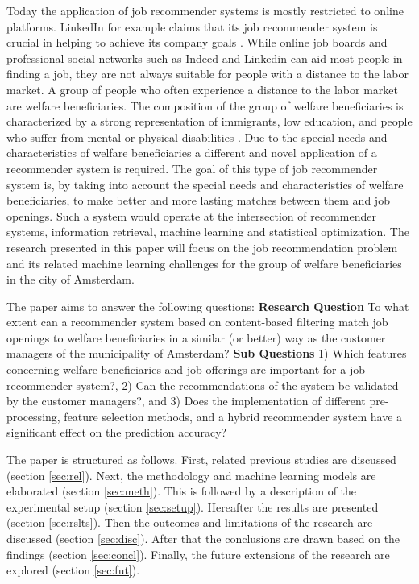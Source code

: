 Today the application of job recommender systems is mostly restricted to online platforms. 
LinkedIn for example claims that its job recommender system is crucial in helping to achieve its company goals \cite{kenthapadi2017personalized}.
While online job boards and professional social networks such as Indeed and Linkedin can aid most people in finding a job, they are not always suitable for people with a distance to the labor market.
A group of people who often experience a distance to the labor market are welfare beneficiaries. 
The composition of the group of welfare beneficiaries is characterized by a strong representation of immigrants, low education, and people who suffer from mental or physical disabilities \cite{dodeweerd}.
Due to the special needs and characteristics of welfare beneficiaries a different and novel application of a recommender system is required. 
The goal of this type of job recommender system is, by taking into account the special needs and characteristics of welfare beneficiaries, to make better and more lasting matches between them and job openings.
Such a system would operate at the intersection of recommender systems, information retrieval, machine learning and statistical optimization. 
The research presented in this paper will focus on the job recommendation problem and its related machine learning challenges for the group of welfare beneficiaries in the city of Amsterdam. 

The paper aims to answer the following questions:
\textbf{Research Question} To what extent can a recommender system based on content-based filtering match job openings to welfare beneficiaries in a similar (or better) way as the customer managers of the municipality of Amsterdam?
\textbf{Sub Questions}
1) Which features concerning welfare beneficiaries and job offerings are important for a job recommender system?, 2) Can the  recommendations of the system be validated by the customer managers?, and 3) Does the implementation of different pre-processing, feature selection methods, and a hybrid recommender system have a significant effect on the prediction accuracy?

The paper is structured as follows. First, related previous studies are discussed (section \ref{sec:rel}). Next, the methodology and machine learning models are elaborated (section \ref{sec:meth}). This is followed by a description of the experimental setup (section \ref{sec:setup}). Hereafter the results are presented (section \ref{sec:rslts}). Then the outcomes and limitations of the research are discussed (section \ref{sec:disc}). After that the conclusions are drawn based on the findings (section \ref{sec:concl}). Finally, the future extensions of the research are explored (section \ref{sec:fut}).

